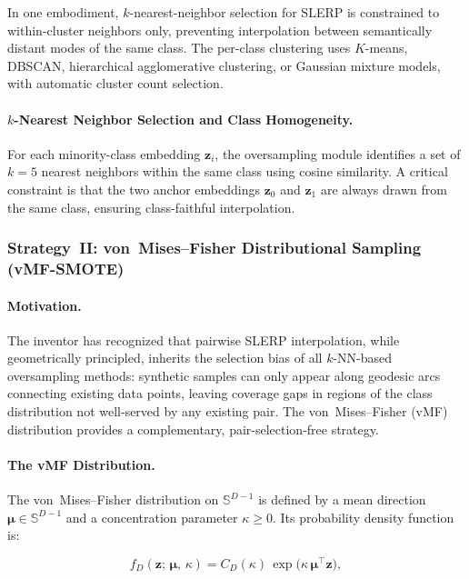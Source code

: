 \documentclass[12pt,letterpaper]{article}
\newcommand{\bz}{\mathbf{z}}
\newcommand{\bmu}{\bm{\mu}}
\newcommand{\Sphere}{\mathbb{S}}
\begin{document}
In one embodiment, $k$-nearest-neighbor selection for SLERP is constrained to
within-cluster neighbors only, preventing interpolation between semantically
distant modes of the same class.  The per-class clustering uses $K$-means,
DBSCAN, hierarchical agglomerative clustering, or Gaussian mixture models,
with automatic cluster count selection.

\paragraph{$k$-Nearest Neighbor Selection and Class Homogeneity.}

For each minority-class embedding $\bz_i$, the oversampling module identifies
a set of $k = 5$ nearest neighbors within the same class using cosine
similarity.  A critical constraint is that the two anchor embeddings $\bz_0$
and $\bz_1$ are always drawn from the same class, ensuring class-faithful
interpolation.

\subsubsection{Strategy~II: von~Mises--Fisher Distributional Sampling (vMF-SMOTE)}

\paragraph{Motivation.}

The inventor has recognized that pairwise SLERP interpolation, while
geometrically principled, inherits the selection bias of all $k$-NN-based
oversampling methods: synthetic samples can only appear along geodesic arcs
connecting existing data points, leaving coverage gaps in regions of the
class distribution not well-served by any existing pair.  The
von~Mises--Fisher (vMF) distribution provides a complementary,
pair-selection-free strategy.

\paragraph{The vMF Distribution.}

The von~Mises--Fisher distribution on $\Sphere^{D-1}$ is defined by a mean
direction $\bmu \in \Sphere^{D-1}$ and a concentration parameter
$\kappa \geq 0$.  Its probability density function is:

\begin{equation}
  f_D(\bz;\, \bmu,\, \kappa) =
    C_D(\kappa)\,\exp\!\bigl(\kappa\,\bmu^\top \bz\bigr),
  \label{eq:vmf_pdf}
\end{equation}
\end{document}
